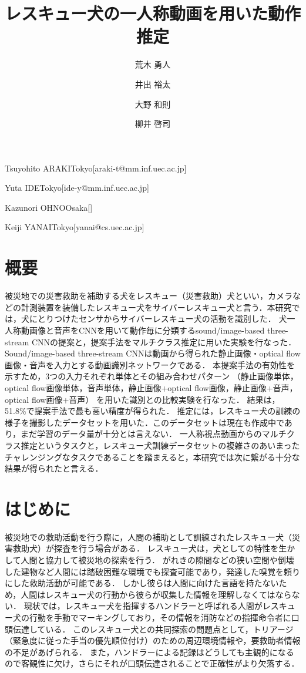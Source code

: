 \documentclass[MIRU,submit]{miru2019j}
\begin{document}
\title{レスキュー犬の一人称動画を用いた動作推定}


 \author{荒木 勇人}{Tsuyohito ARAKI}{Tokyo}[araki-t@mm.inf.uec.ac.jp]
 \author{井出 裕太}{Yuta IDE}{Tokyo}[ide-y@mm.inf.uec.ac.jp]
 \author{大野 和則}{Kazunori OHNO}{Osaka}[]
 \author{柳井 啓司}{Keiji YANAI}{Tokyo}[yanai@cs.uec.ac.jp]


\maketitle
\section*{概要}
被災地での災害救助を補助する犬をレスキュー（災害救助）犬といい，カメラなどの計測装置を装備したレスキュー犬をサイバーレスキュー犬と言う．本研究では，犬にとりつけたセンサからサイバーレスキュー犬の活動を識別した．
犬一人称動画像と音声をCNNを用いて動作毎に分類するsound/image-based three-stream CNNの提案と，提案手法をマルチクラス推定に用いた実験を行なった．
Sound/image-based three-stream CNNは動画から得られた静止画像・optical flow画像・音声を入力とする動画識別ネットワークである．
本提案手法の有効性を示すため，3つの入力それぞれ単体とその組み合わせパターン
（静止画像単体，optical flow画像単体，音声単体，静止画像+optical flow画像，静止画像+音声，optical flow画像+音声）
を用いた識別との比較実験を行なった．
結果は，51.8\%で提案手法で最も高い精度が得られた．
推定には，レスキュー犬の訓練の様子を撮影したデータセットを用いた．このデータセットは現在も作成中であり，まだ学習のデータ量が十分とは言えない．
一人称視点動画からのマルチクラス推定というタスクと，レスキュー犬訓練データセットの複雑さのあいまったチャレンジングなタスクであることを踏まえると，本研究では次に繋がる十分な結果が得られたと言える．

\section{はじめに}
被災地での救助活動を行う際に，人間の補助として訓練されたレスキュー犬（災害救助犬）が探査を行う場合がある．
レスキュー犬は，犬としての特性を生かして人間と協力して被災地の探索を行う．
がれきの隙間などの狭い空間や倒壊した建物など人間には踏破困難な環境でも探査可能であり，発達した嗅覚を頼りにした救助活動が可能である．
しかし彼らは人間に向けた言語を持たないため，人間はレスキュー犬の行動から彼らが収集した情報を理解しなくてはならない．
現状では，レスキュー犬を指揮するハンドラーと呼ばれる人間がレスキュー犬の行動を手動でマーキングしており，その情報を消防などの指揮命令者に口頭伝達している．
このレスキュー犬との共同探索の問題点として，トリアージ（緊急度に従った手当の優先順位付け）のための周辺環境情報や，要救助者情報の不足があげられる．
また，ハンドラーによる記録はどうしても主観的になるので客観性に欠け，さらにそれが口頭伝達されることで正確性がより欠落する．
\end{document}
